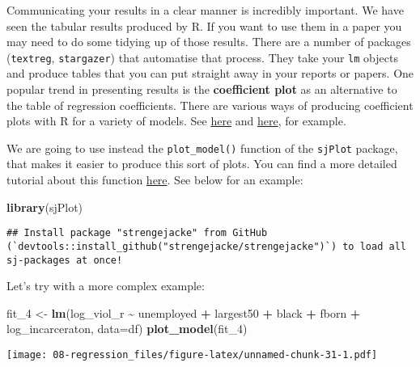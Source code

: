 \documentclass[
]{book}
\newenvironment{Shaded}{\begin{snugshade}}{\end{snugshade}}
\newcommand{\AttributeTok}[1]{\textcolor[rgb]{0.13,0.29,0.53}{#1}}
\newcommand{\FunctionTok}[1]{\textcolor[rgb]{0.13,0.29,0.53}{\textbf{#1}}}
\newcommand{\NormalTok}[1]{#1}
\newcommand{\OtherTok}[1]{\textcolor[rgb]{0.56,0.35,0.01}{#1}}
\newcommand{\SpecialCharTok}[1]{\textcolor[rgb]{0.81,0.36,0.00}{\textbf{#1}}}
\begin{document}
Communicating your results in a clear manner is incredibly important. We have seen the tabular results produced by R. If you want to use them in a paper you may need to do some tidying up of those results. There are a number of packages (\texttt{textreg}, \texttt{stargazer}) that automatise that process. They take your \texttt{lm} objects and produce tables that you can put straight away in your reports or papers. One popular trend in presenting results is the \textbf{coefficient plot} as an alternative to the table of regression coefficients. There are various ways of producing coefficient plots with R for a variety of models. See \href{http://www.carlislerainey.com/2012/06/30/coefficient-plots-in-r/}{here} and \href{http://www.carlislerainey.com/2012/07/03/an-improvement-to-coefficient-plots/}{here}, for example.

We are going to use instead the \texttt{plot\_model()} function of the \texttt{sjPlot} package, that makes it easier to produce this sort of plots. You can find a more detailed tutorial about this function \href{http://rpubs.com/sjPlot/sjplm}{here}. See below for an example:

\begin{Shaded}
\begin{Highlighting}[]
\FunctionTok{library}\NormalTok{(sjPlot)}
\end{Highlighting}
\end{Shaded}

\begin{verbatim}
## Install package "strengejacke" from GitHub (`devtools::install_github("strengejacke/strengejacke")`) to load all sj-packages at once!
\end{verbatim}

Let's try with a more complex example:

\begin{Shaded}
\begin{Highlighting}[]
\NormalTok{fit\_4 }\OtherTok{\textless{}{-}} \FunctionTok{lm}\NormalTok{(log\_viol\_r }\SpecialCharTok{\textasciitilde{}}\NormalTok{ unemployed }\SpecialCharTok{+}\NormalTok{ largest50 }\SpecialCharTok{+}\NormalTok{ black }\SpecialCharTok{+}\NormalTok{ fborn }\SpecialCharTok{+}\NormalTok{ log\_incarceraton, }\AttributeTok{data=}\NormalTok{df)}
\FunctionTok{plot\_model}\NormalTok{(fit\_4)}
\end{Highlighting}
\end{Shaded}

\texttt{[image: 08-regression\_files/figure-latex/unnamed-chunk-31-1.pdf]}
\end{document}
